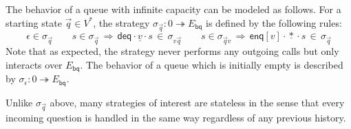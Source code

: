 \documentclass[acmsmall,nonacm]{acmart}
\newcommand{\kw}[1]{\ensuremath{ \mathsf{#1} }}
\newcommand{\emptysig}{0}
\begin{document}
\begin{example} %
The behavior of a queue with infinite capacity
can be modeled as follows.
For a starting state $\vec{q} \in V^*$,
the strategy $\sigma_{\vec{q}} : \emptysig \twoheadrightarrow E_\kw{bq}$
is defined by the following rules:
\[
  \epsilon \in \sigma_{\vec{q}}
  \qquad
  s \in \sigma_{\vec{q}} \,\Rightarrow\,
  \kw{deq} \cdot \underline{v} \cdot s \, \in \, \sigma_{v \vec{q}}
  \qquad
  s \in \sigma_{\vec{q} v} \,\Rightarrow\,
  \kw{enq}[v] \cdot \underline{*} \cdot s \, \in \, \sigma_{\vec{q}}
\]
Note that as expected, the strategy never performs any outgoing calls
but only interacts over $E_\kw{bq}$.
The behavior of a queue which is initially empty
is described by $\sigma_\epsilon : \emptysig \twoheadrightarrow E_\kw{bq}$.
\end{example}


Unlike $\sigma_{\vec{q}}$ above,
many strategies of interest are stateless
in the sense that every incoming question
is handled in the same way
regardless of any previous history.
\end{document}
